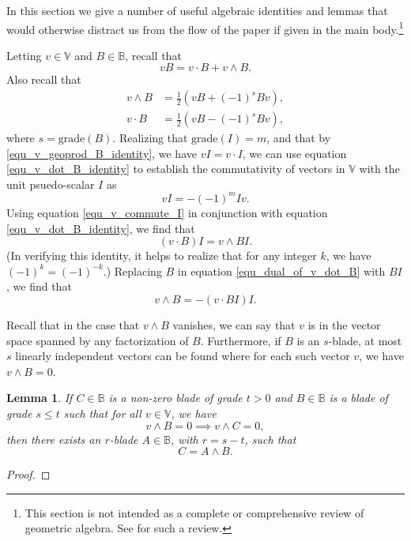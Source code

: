 \documentclass{birkjour}
\newtheorem{lem}[thm]{Lemma}
\theoremstyle{definition}
\theoremstyle{remark}
\numberwithin{equation}{section}
\newcommand{\B}{\mathbb{B}}
\newcommand{\V}{\mathbb{V}}
\newcommand{\grade}{\mbox{grade}}
\begin{document}
In this section we give a number of useful algebraic identities and lemmas that would
otherwise distract us from the flow of the paper if given in the main body.\footnote{This
section is not intended as a complete or comprehensive review of geometric algebra.
See \cite{} for such a review.}

Letting $v\in\V$ and $B\in\B$, recall that
\begin{equation}\label{equ_v_geoprod_B_identity}
vB = v\cdot B+v\wedge B.
\end{equation}
Also recall that
\begin{align}
v\wedge B &= \frac{1}{2}(vB+(-1)^sBv),\label{equ_v_wedge_B_identity} \\
v\cdot B &= \frac{1}{2}(vB-(-1)^sBv),\label{equ_v_dot_B_identity}
\end{align}
where $s=\grade(B)$.
Realizing that $\grade(I)=m$, and that by \eqref{equ_v_geoprod_B_identity}, we have $vI=v\cdot I$, we can use
equation \eqref{equ_v_dot_B_identity} to establish the commutativity of vectors in $\V$ with the unit psuedo-scalar $I$ as
\begin{equation}\label{equ_v_commute_I}
vI = -(-1)^mIv.
\end{equation}
Using equation \eqref{equ_v_commute_I} in conjunction with equation \eqref{equ_v_dot_B_identity}, we find that
\begin{equation}\label{equ_dual_of_v_dot_B}
(v\cdot B)I = v\wedge BI.
\end{equation}
(In verifying this identity, it helps to realize that for any integer $k$, we have $(-1)^k=(-1)^{-k}$.)
Replacing $B$ in equation \eqref{equ_dual_of_v_dot_B} with $BI$, we find that
\begin{equation}\label{equ_dual_of_v_dot_dual_B}
v\wedge B = -(v\cdot BI)I.
\end{equation}

Recall that in the case that $v\wedge B$ vanishes, we can say that $v$ is
in the vector space spanned by any factorization of $B$.  Furthermore,
if $B$ is an $s$-blade, at most $s$ linearly independent vectors can be
found where for each such vector $v$, we have $v\wedge B=0$.

\begin{lem}
If $C\in\B$ is a non-zero blade of grade $t>0$ and $B\in\B$ is a blade
of grade $s\leq t$ such that for all $v\in\V$, we have
\begin{equation*}
v\wedge B=0\implies v\wedge C=0,
\end{equation*}
then there exists an $r$-blade $A\in\B$, with $r=s-t$, such that
\begin{equation*}
C = A\wedge B.
\end{equation*}
\end{lem}
\begin{proof}
\end{proof}
\end{document}
